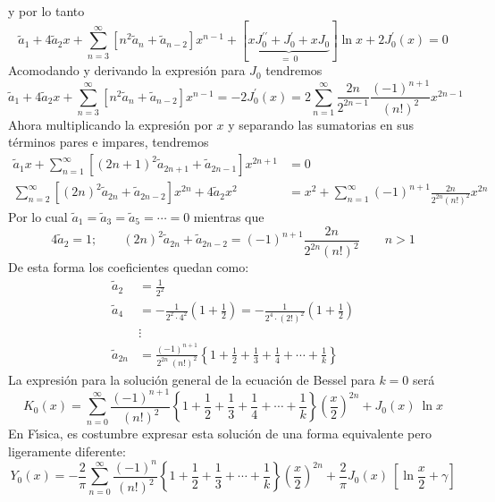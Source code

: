 \documentclass[spanish,notitlepage,letterpaper,12pt]{article}
\begin{document}
y por lo tanto
\[
\tilde{a}_{1}+4\tilde{a}_{2}x+\sum_{n=3}^{\infty}\left[  n^{2}\tilde{a}%
_{n}+\tilde{a}_{n-2}\right]  x^{n-1}+\left[  \underbrace{xJ_{0}^{\prime\prime
}+J_{0}^{\prime}+xJ_{0}}_{=\ 0}\right]  \ln x+2J_{0}^{\prime}(x)=0
\]
Acomodando y derivando la expresi\'{o}n para $J_{0}$ tendremos
\[
\tilde{a}_{1}+4\tilde{a}_{2}x+\sum_{n=3}^{\infty}\left[  n^{2}\tilde{a}%
_{n}+\tilde{a}_{n-2}\right]  x^{n-1}=-2J_{0}^{\prime}(x)=2\sum_{n=1}^{\infty
}\frac{2n}{2^{2n-1}}\frac{\left(  -1\right)  ^{n+1}}{\left(  n!\right)  ^{2}%
}x^{2n-1}
\]
Ahora multiplicando la expresi\'{o}n por $x$ y separando las sumatorias en sus
t\'{e}rminos pares e impares, tendremos
\begin{align*}
\tilde{a}_{1}x+\sum_{n=1}^{\infty}\left[  \left(  2n+1\right)  ^{2}\tilde
{a}_{2n+1}+\tilde{a}_{2n-1}\right]  x^{2n+1}  & =0\\
\sum_{n=2}^{\infty}\left[  \left(  2n\right)  ^{2}\tilde{a}_{2n}+\tilde
{a}_{2n-2}\right]  x^{2n}+4\tilde{a}_{2}x^{2}  & =x^{2}+\sum_{n=1}^{\infty
}\left(  -1\right)  ^{n+1}\frac{2n}{2^{2n}\left(  n!\right)  ^{2}}x^{2n}%
\end{align*}
Por lo cual $\tilde{a}_{1}=\tilde{a}_{3}=\tilde{a}_{5}=\cdots=0$ mientras que
\[
4\tilde{a}_{2}=1;\qquad\left(  2n\right)  ^{2}\tilde{a}_{2n}+\tilde{a}%
_{2n-2}=\left(  -1\right)  ^{n+1}\frac{2n}{2^{2n}\left(  n!\right)  ^{2}%
}\qquad n>1
\]
De esta forma los coeficientes quedan como:
\begin{align*}
\tilde{a}_{2}  & =\frac1{2^{2}}\\
\tilde{a}_{4}  & =-\frac1{2^{2}\cdot4^{2}}\left(  1+\frac12\right)
=-\frac1{2^{4}\cdot\left(  2!\right)  ^{2}}\left(  1+\frac12\right) \\
& \vdots\\
\tilde{a}_{2n}  & =\frac{\left(  -1\right)  ^{n+1}}{2^{2n}\ \left(  n!\right)
^{2}}\left\{  1+\frac12+\frac13+\frac14+\cdots+\frac1k\right\}
\end{align*}
La expresi\'{o}n para la soluci\'{o}n general de la ecuaci\'{o}n de Bessel
para $k=0$ ser\'{a}
\[
K_{0}(x)=\sum_{n=0}^{\infty}\frac{\left(  -1\right)  ^{n+1}}{\left(
n!\right)  ^{2}}\left\{  1+\frac12+\frac13+\frac14+\cdots+\frac1k\right\}
\left(  \frac x2\right)  ^{2n}+J_{0}(x)\ \ln x
\]
En F\'{\i}sica, es costumbre expresar esta soluci\'{o}n de una forma
equivalente pero ligeramente diferente:
\[
Y_{0}(x)=-\frac2\pi\sum_{n=0}^{\infty}\frac{\left(  -1\right)  ^{n}}{\left(
n!\right)  ^{2}}\left\{  1+\frac12+\frac13+\cdots+\frac1k\right\}  \left(
\frac x2\right)  ^{2n}+\frac2\pi J_{0}(x)\ \left[  \ln\frac x2+\gamma\right]
\]
\end{document}
